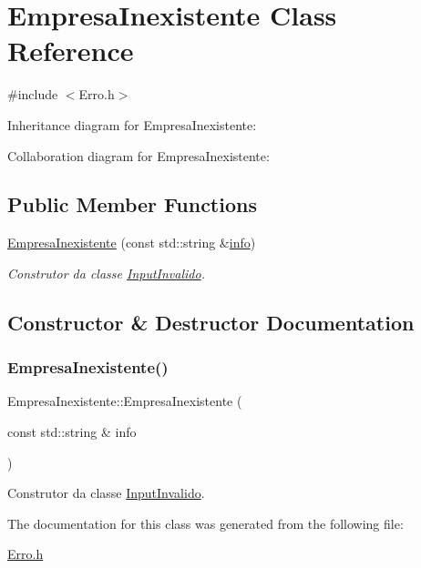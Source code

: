 \hypertarget{class_empresa_inexistente}{}\section{Empresa\+Inexistente Class Reference}
\label{class_empresa_inexistente}


{\ttfamily \#include $<$Erro.\+h$>$}



Inheritance diagram for Empresa\+Inexistente\+:


Collaboration diagram for Empresa\+Inexistente\+:
\subsection*{Public Member Functions}
\begin{DoxyCompactItemize}
\item 
\mbox{\hyperlink{class_empresa_inexistente_a96bfdab77510c1f330c6c66b7df19edd}{Empresa\+Inexistente}} (const std\+::string \&\mbox{\hyperlink{class_erro_a3ecaaf6f8e15a0830a648035b456cb62}{info}})
\begin{DoxyCompactList}\small\item\em Construtor da classe \mbox{\hyperlink{class_input_invalido}{Input\+Invalido}}. \end{DoxyCompactList}\end{DoxyCompactItemize}


\subsection{Constructor \& Destructor Documentation}
\mbox{\label{class_empresa_inexistente_a96bfdab77510c1f330c6c66b7df19edd}} 
\subsubsection{\texorpdfstring{Empresa\+Inexistente()}{EmpresaInexistente()}}
{\footnotesize\ttfamily Empresa\+Inexistente\+::\+Empresa\+Inexistente (\begin{DoxyParamCaption}\item[{const std\+::string \&}]{info }\end{DoxyParamCaption})\hspace{0.3cm}{\ttfamily [inline]}}



Construtor da classe \mbox{\hyperlink{class_input_invalido}{Input\+Invalido}}. 



The documentation for this class was generated from the following file\+:\begin{DoxyCompactItemize}
\item 
\mbox{\hyperlink{_erro_8h}{Erro.\+h}}\end{DoxyCompactItemize}
